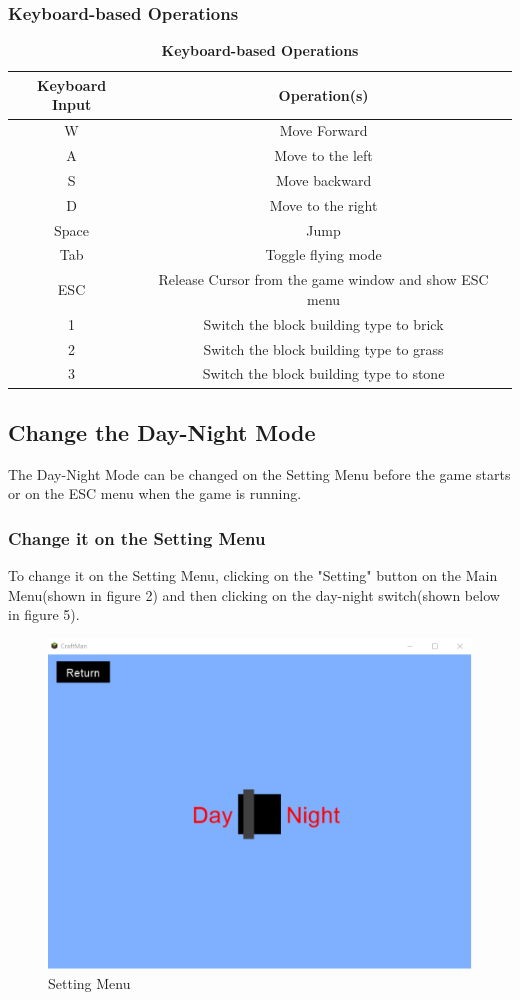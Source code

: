 \documentclass[12pt, titlepage]{article}
\begin{document}
\subsubsection{Keyboard-based Operations}
\begin{table}[!htbp]
\centering
\begin{tabular}{ |c|c| }
\hline
 \textbf{Keyboard Input} & \textbf{Operation(s)} \\ \hline
 W & Move Forward \\ \hline
 A & Move to the left \\ \hline
 S & Move backward \\ \hline
 D & Move to the right \\ \hline
 Space & Jump \\ \hline
 Tab & Toggle flying mode\\ \hline
 ESC & Release Cursor from the game window and show ESC menu\\ \hline
 1 & Switch the block building type to brick\\ \hline
 2 & Switch the block building type to grass\\ \hline
 3 & Switch the block building type to stone\\ \hline
\end{tabular}
\caption{\textbf{Keyboard-based Operations}}
\end{table}


\subsection{Change the Day-Night Mode}
The Day-Night Mode can be changed on the Setting Menu before the game starts or on the ESC menu when the game is running.
\subsubsection{Change it on the Setting Menu}
To change it on the Setting Menu, clicking on the "Setting" button on the Main Menu(shown in figure 2) and then clicking on the day-night switch(shown below in figure 5).
\FloatBarrier
\begin{figure}[h]
\centering
\includegraphics[scale=0.25]{settingmenu}
\caption{Setting Menu}
\end{figure}
\FloatBarrier
\end{document}
